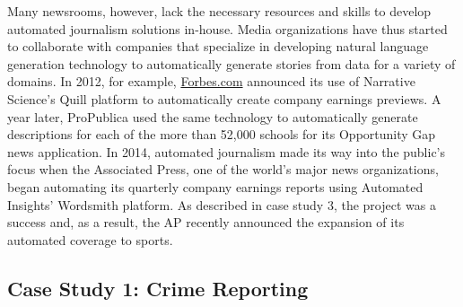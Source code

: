 \documentclass[notoc, symmetric, nobib, nols]{towcenter-book}
\begin{document}
Many newsrooms, however, lack the necessary resources and skills to develop automated journalism solutions in-house. Media organizations have thus started to collaborate with companies that specialize in developing natural language generation technology to automatically generate stories from data for a variety of domains. In 2012, for example, \href{http://Forbes.com}{Forbes.com} announced its use of Narrative Science’s Quill platform to automatically create company earnings previews.\cite{levy12} A year later, ProPublica used the same technology to automatically generate descriptions for each of the more than 52,000 schools for its Opportunity Gap news application.\cite{klein13} In 2014, automated journalism made its way into the public’s focus when the Associated Press, one of the world’s major news organizations, began automating its quarterly company earnings reports using Automated Insights’ Wordsmith platform. As described in case study 3, the project was a success and, as a result, the AP recently announced the expansion of its automated coverage to sports.\cite{ap15} 

\subsection{Case Study 1: Crime Reporting}
\end{document}
